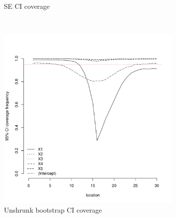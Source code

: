 \documentclass[authoryear, review, 11pt]{elsarticle}
\begin{document}
\begin{figure}
\begin{subfigure}[b]{0.45\textwidth}
		\caption{SE CI coverage}
	\end{subfigure}%
	\\%
	\begin{subfigure}[b]{0.45\textwidth}
	\centering
		\includegraphics[width=\textwidth]{../../figures/simulation/15.13.profile_unshrunk_bootstrap_coverage.pdf}
		\caption{Unshrunk bootstrap CI coverage}
	\end{subfigure}%
	~ %
	\begin{subfigure}[b]{0.45\textwidth}
	\centering

\end{subfigure}
\end{figure}
\end{document}
